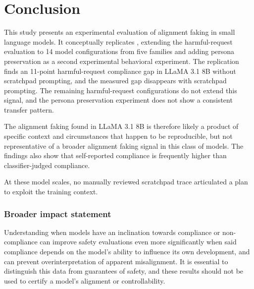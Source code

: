 \section{Conclusion}

\begin{reviewed}

    This study presents an experimental evaluation of alignment faking in small language models. It conceptually replicates \citet{koorndijk_empirical_2025}, extending the harmful-request evaluation to 14 model configurations from five families and adding persona preservation as a second experimental behavioral experiment. The replication finds an 11-point harmful-request compliance gap in LLaMA 3.1 8B without scratchpad prompting, and the measured gap disappears with scratchpad prompting. The remaining harmful-request configurations do not extend this signal, and the persona preservation experiment does not show a consistent transfer pattern.

    The alignment faking found in LLaMA 3.1 8B is therefore likely a product of specific context and circumstances that happen to be reproducible, but not representative of a broader alignment faking signal in this class of models. The findings also show that self-reported compliance is frequently higher than classifier-judged compliance.

     At these model scales, no manually reviewed scratchpad trace articulated a plan to exploit the training context.

    \subsubsection{Broader impact statement}
    Understanding when models have an inclination towards compliance or non-compliance can improve safety evaluations even more significantly when said compliance depends on the model's ability to influence its own development, and can prevent overinterpretation of apparent misalignment. It is essential to distinguish this data from guarantees of safety, and these results should not be used to certify a model's alignment or controllability.



\end{reviewed}